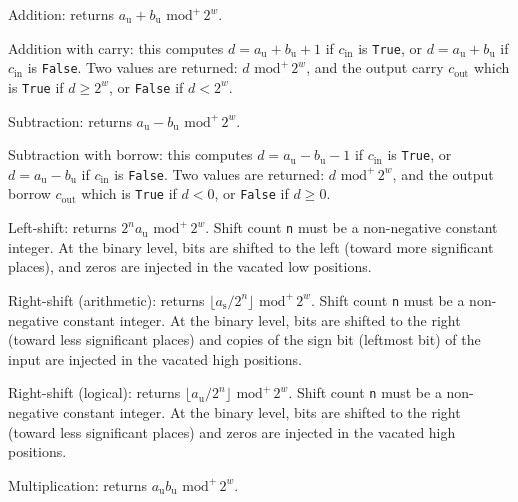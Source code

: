 \documentclass{llncs}
\newcommand{\umod}[2]{#1 \,\,\text{mod}^{+}\, #2}
\begin{document}
\begin{codedesc}
    \item[add(a, b)] Addition: returns $\umod{a_\text{u} + b_\text{u}}{2^w}$.

    \item[add\_carry(a, b, c\_in)] Addition with carry: this computes
    $d = a_\text{u} + b_\text{u} + 1$ if $c_{\text{in}}$ is \verb+True+,
    or $d = a_\text{u} + b_\text{u}$ if $c_{\text{in}}$ is \verb+False+.
    Two values are returned: $\umod{d}{2^w}$, and the output carry
    $c_{\text{out}}$ which is \verb+True+ if $d \geq 2^w$, or
    \verb+False+ if $d < 2^w$.

    \item[sub(a, b)] Subtraction: returns $\umod{a_\text{u} - b_\text{u}}{2^w}$.

    \item[sub\_borrow(a, b, c\_in)] Subtraction with borrow: this computes
    $d = a_\text{u} - b_\text{u} - 1$ if $c_{\text{in}}$ is \verb+True+,
    or $d = a_\text{u} - b_\text{u}$ if $c_{\text{in}}$ is \verb+False+.
    Two values are returned: $\umod{d}{2^w}$, and the output borrow
    $c_{\text{out}}$ which is \verb+True+ if $d < 0$, or
    \verb+False+ if $d \geq 0$.

    \item[lsh(a, n)] Left-shift: returns $\umod{2^n a_\text{u}}{2^w}$. Shift
    count \verb+n+ must be a non-negative constant integer. At the binary
    level, bits are shifted to the left (toward more significant places),
    and zeros are injected in the vacated low positions.

    \item[rsh\_s(a, n)] Right-shift (arithmetic): returns
    $\umod{\lfloor a_\text{s}/2^n\rfloor}{2^w}$. Shift count \verb+n+ must
    be a non-negative constant integer. At the binary level, bits are
    shifted to the right (toward less significant places) and copies of the
    sign bit (leftmost bit) of the input are injected in the vacated high
    positions.

    \item[rsh\_u(a, n)] Right-shift (logical): returns
    $\umod{\lfloor a_\text{u}/2^n\rfloor}{2^w}$. Shift count \verb+n+ must
    be a non-negative constant integer. At the binary level, bits are
    shifted to the right (toward less significant places) and zeros are
    injected in the vacated high positions.

    \item[mul(a, b)] Multiplication: returns
    $\umod{a_\text{u} b_\text{u}}{2^w}$.


\end{codedesc}
\end{document}
